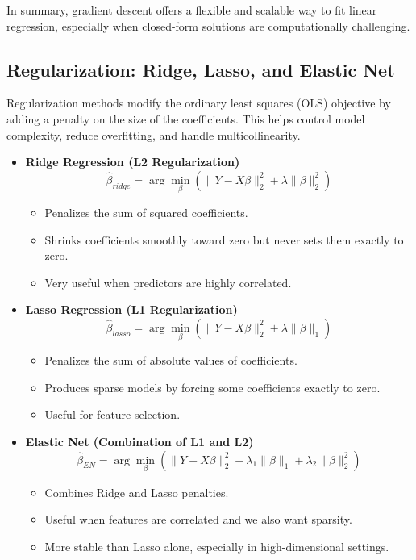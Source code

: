 \documentclass[11pt,a4paper]{article}
\begin{document}
In summary, gradient descent offers a flexible and scalable way to fit linear regression, especially when closed-form solutions are computationally challenging.



\subsection{Regularization: Ridge, Lasso, and Elastic Net}

Regularization methods modify the ordinary least squares (OLS) objective by adding a penalty on the size of the coefficients.  
This helps control model complexity, reduce overfitting, and handle multicollinearity.

\begin{itemize}

    \item \textbf{Ridge Regression (L2 Regularization)}
    \[
        \hat{\beta}_{ridge} 
        = \arg\min_{\beta} 
        \left( 
            \|Y - X\beta\|_2^2 
            + \lambda \|\beta\|_2^2 
        \right)
    \]
    \begin{itemize}
        \item Penalizes the sum of squared coefficients.  
        \item Shrinks coefficients smoothly toward zero but never sets them exactly to zero.  
        \item Very useful when predictors are highly correlated.
    \end{itemize}

    \item \textbf{Lasso Regression (L1 Regularization)}
    \[
        \hat{\beta}_{lasso} 
        = \arg\min_{\beta} 
        \left( 
            \|Y - X\beta\|_2^2 
            + \lambda \|\beta\|_1 
        \right)
    \]
    \begin{itemize}
        \item Penalizes the sum of absolute values of coefficients.  
        \item Produces sparse models by forcing some coefficients exactly to zero.  
        \item Useful for feature selection.
    \end{itemize}

    \item \textbf{Elastic Net (Combination of L1 and L2)}
    \[
        \hat{\beta}_{EN} 
        = \arg\min_{\beta}
        \left(
            \|Y - X\beta\|_2^2
            + \lambda_1 \|\beta\|_1
            + \lambda_2 \|\beta\|_2^2
        \right)
    \]
    \begin{itemize}
        \item Combines Ridge and Lasso penalties.  
        \item Useful when features are correlated and we also want sparsity.  
        \item More stable than Lasso alone, especially in high-dimensional settings.
    \end{itemize}

\end{itemize}
\end{document}
